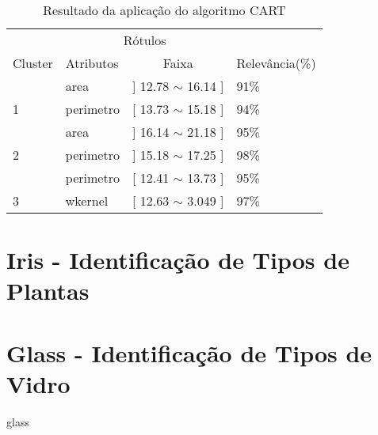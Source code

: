 \begin{table}[!h]
\centering
\caption{Resultado da aplicação do algoritmo CART}
\label{tab:rot:seeds:cart}
\begin{tabular}{llrl}
\hline \hline
\multicolumn{1}{c}{\cellcolor[HTML]{FFFFFF}} & \multicolumn{2}{c}{Rótulos}                      & \multicolumn{1}{r}{}            \\ \cline{2-3}
Cluster                                      & Atributos      & \multicolumn{1}{c}{Faixa}       & \multicolumn{1}{c}{Relevância(\%)} \\ \hline\hline
                                             & area           & ] 12.78 $\sim$  16.14 ]         & 91\%          \\  
\multirow{-2}{*}{1}                          & perimetro      & [ 13.73 $\sim$ 15.18 ]          & 94\%          \\ \hline
                                             & area           & ] 16.14 $\sim$  21.18 ]          & 95\%          \\ 
\multirow{-2}{*}{2}                          & perimetro      & ] 15.18 $\sim$  17.25 ]          & 98\%          \\  \hline
                                             & perimetro      & [ 12.41 $\sim$  13.73 ]         & 95\%          \\
\multirow{-2}{*}{3}                          & wkernel        & [ 12.63 $\sim$  3.049 ]         & 97\%          \\ \hline \hline
\end{tabular}
\end{table}

\section{Iris - Identificação de Tipos de Plantas}

\section{Glass - Identificação de Tipos de Vidro}


glass
